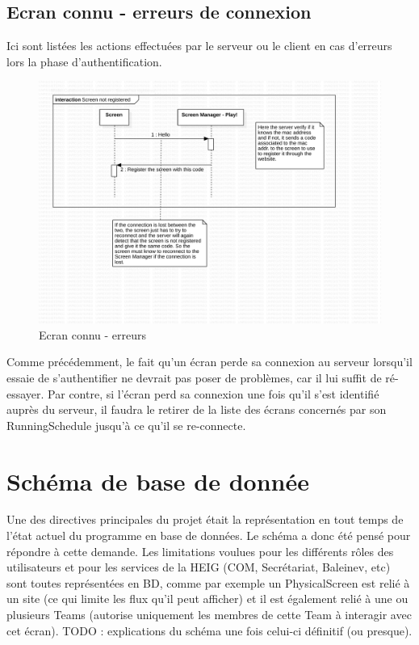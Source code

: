 \documentclass[french]{article}
\begin{document}
\subsection{Ecran connu - erreurs de connexion}
	Ici sont listées les actions effectuées par le serveur ou le client en cas d'erreurs lors la phase d'authentification.
	\begin{figure}[h!]
		\centering
		\includegraphics[page={2}, scale=0.5]{protocol_v2}
		\caption{Ecran connu - erreurs}
	\end{figure}
	
			
	Comme précédemment, le fait qu'un écran perde sa connexion au serveur lorsqu'il essaie de s'authentifier ne devrait pas poser de problèmes, car il lui suffit de ré-essayer. \newline
	Par contre, si l'écran perd sa connexion une fois qu'il s'est identifié auprès du serveur, il faudra le retirer de la liste des écrans concernés par son RunningSchedule jusqu'à ce qu'il se re-connecte. \newpage

	
\section{Schéma de base de donnée}
Une des directives principales du projet était la représentation en tout temps de l'état actuel du programme en base de données. Le schéma a donc été pensé pour répondre à cette demande. Les limitations voulues pour les différents rôles des utilisateurs et pour les services de la HEIG (COM, Secrétariat, Baleinev, etc) sont toutes représentées en BD, comme par exemple un PhysicalScreen est relié à un site (ce qui limite les flux qu'il peut afficher) et il est également relié à une ou plusieurs Teams (autorise uniquement les membres de cette Team à interagir avec cet écran).
\newline TODO : explications du schéma une fois celui-ci définitif (ou presque).
\end{document}
